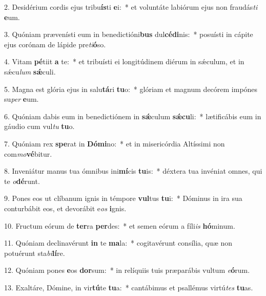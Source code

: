 2. Desidérium cordis ejus tribu\textbf{ís}ti \textbf{e}i:~*  et voluntáte labiórum ejus non fraudás\textit{ti} \textbf{e}um.\

3. Quóniam prævenísti eum in benedictióni\textbf{bus} dul\textbf{cé}\textbf{di}nis:~*  posuísti in cápite ejus corónam de lápide pre\textit{ti}\textbf{ó}so.\

4. Vitam \textbf{pé}tiit \textbf{a} te:~*  et tribuísti ei longitúdinem diérum in sǽculum, et in sǽcu\textit{lum} \textbf{sǽ}culi.\

5. Magna est glória ejus in salu\textbf{tá}ri \textbf{tu}o:~*  glóriam et magnum decórem impónes su\textit{per} \textbf{e}um.\

6. Quóniam dabis eum in benedictiónem in \textbf{sǽ}culum \textbf{sǽ}\textbf{cu}li:~*  lætificábis eum in gáudio cum vul\textit{tu} \textbf{tu}o.\

7. Quóniam rex \textbf{spe}rat in \textbf{Dó}\textbf{mi}no:~*  et in misericórdia Altíssimi non com\textit{mo}\textbf{vé}bitur.\

8. Inveniátur manus tua ómnibus ini\textbf{mí}cis \textbf{tu}is:~*  déxtera tua invéniat omnes, qui te \textit{o}\textbf{dé}runt.\

9. Pones eos ut clíbanum ignis in témpore \textbf{vul}tus \textbf{tu}i:~*  Dóminus in ira sua conturbábit eos, et devorábit e\textit{os} \textbf{i}gnis.\

10. Fructum eórum de \textbf{ter}ra \textbf{per}des:~*  et semen eórum a fíli\textit{is} \textbf{hó}minum.\

11. Quóniam declinavérunt \textbf{in} te \textbf{ma}la:~*  cogitavérunt consília, quæ non potuérunt sta\textit{bi}\textbf{lí}re.\

12. Quóniam pones \textbf{e}os \textbf{dor}sum:~*  in relíquiis tuis præparábis vultum \textit{e}\textbf{ó}rum.\

13. Exaltáre, Dómine, in vir\textbf{tú}te \textbf{tu}a:~*  cantábimus et psallémus virtú\textit{tes} \textbf{tu}as.\

